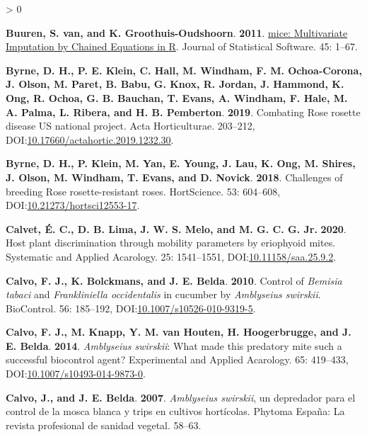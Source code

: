 \documentclass{ufdissertation}[overrideChapters] %
\newlength{\cslhangindent}
\newenvironment{CSLReferences}[2] %
 {%
  \setlength{\parindent}{0pt}
  \ifodd #1 \everypar{\setlength{\hangindent}{\cslhangindent}}\ignorespaces\fi
  \ifnum #2 > 0
  \setlength{\parskip}{#2\baselineskip}
  \fi
 }%
 {}
\begin{document}
{\begin{CSLReferences}{1}{1}
\leavevmode{}%
\textbf{Buuren, S. van, and K. Groothuis-Oudshoorn}. \textbf{2011}. \href{https://www.jstatsoft.org/v45/i03/}{{mice}: {Multivariate} {Imputation} by {Chained} {Equations} in {R}}. Journal of Statistical Software. 45: 1--67.

\leavevmode{}%
\textbf{Byrne, D. H., P. E. Klein, C. Hall, M. Windham, F. M. Ochoa-Corona, J. Olson, M. Paret, B. Babu, G. Knox, R. Jordan, J. Hammond, K. Ong, R. Ochoa, G. B. Bauchan, T. Evans, A. Windham, F. Hale, M. A. Palma, L. Ribera, and H. B. Pemberton}. \textbf{2019}. Combating {Rose rosette disease} {US} national project. Acta Horticulturae. 203--212, DOI:\href{https://doi.org/10.17660/actahortic.2019.1232.30}{10.17660/actahortic.2019.1232.30}.

\leavevmode{}%
\textbf{Byrne, D. H., P. Klein, M. Yan, E. Young, J. Lau, K. Ong, M. Shires, J. Olson, M. Windham, T. Evans, and D. Novick}. \textbf{2018}. Challenges of breeding {Rose rosette}-resistant roses. {HortScience}. 53: 604--608, DOI:\href{https://doi.org/10.21273/hortsci12553-17}{10.21273/hortsci12553-17}.

\leavevmode{}%
\textbf{Calvet, É. C., D. B. Lima, J. W. S. Melo, and M. G. C. G. Jr.} \textbf{2020}. Host plant discrimination through mobility parameters by eriophyoid mites. Systematic and Applied Acarology. 25: 1541--1551, DOI:\href{https://doi.org/10.11158/saa.25.9.2}{10.11158/saa.25.9.2}.

\leavevmode{}%
\textbf{Calvo, F. J., K. Bolckmans, and J. E. Belda}. \textbf{2010}. Control of {\emph{Bemisia tabaci}} and {\emph{Frankliniella occidentalis}} in cucumber by {\emph{Amblyseius swirskii}}. {BioControl}. 56: 185--192, DOI:\href{https://doi.org/10.1007/s10526-010-9319-5}{10.1007/s10526-010-9319-5}.

\leavevmode{}%
\textbf{Calvo, F. J., M. Knapp, Y. M. van Houten, H. Hoogerbrugge, and J. E. Belda}. \textbf{2014}. {\emph{Amblyseius swirskii}}: What made this predatory mite such a successful biocontrol agent? Experimental and Applied Acarology. 65: 419--433, DOI:\href{https://doi.org/10.1007/s10493-014-9873-0}{10.1007/s10493-014-9873-0}.

\leavevmode{}%
\textbf{Calvo, J., and J. E. Belda}. \textbf{2007}. {\emph{Amblyseius swirskii}}, un depredador para el control de la mosca blanca y trips en cultivos hort{í}colas. Phytoma Espa{ñ}a: La revista profesional de sanidad vegetal. 58--63.


\end{CSLReferences}}
\end{document}
